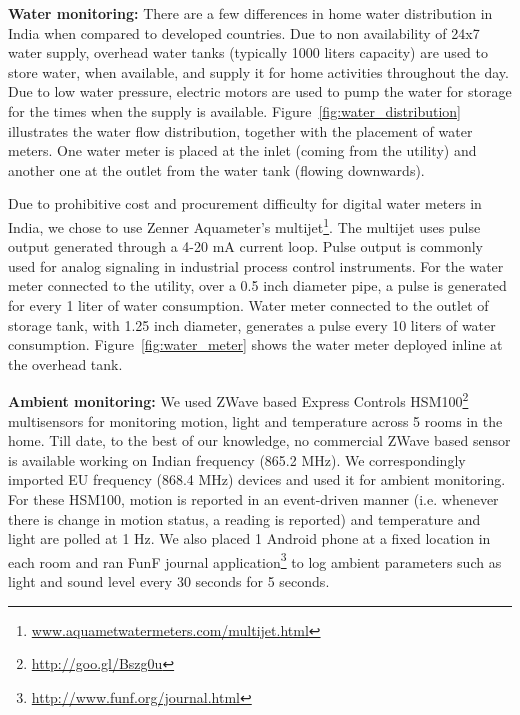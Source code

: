 \documentclass[10pt]{sensys-proc}
\newcommand{\figref}[1]{Figure~\ref{#1}}
\begin{document}
\noindent \textbf{Water monitoring:} There are a few differences in home water distribution in India when compared to developed countries. Due to non availability of 24x7 water supply, overhead water tanks (typically 1000 liters capacity) are used to store water, when available, and supply it for home activities throughout the day. Due to low water pressure, electric motors are used to pump the water for storage for the times when the supply is available. %
\figref{fig:water_distribution} illustrates the water flow distribution, together with the placement of water meters. One water meter is placed at the inlet (coming from the utility) and another one at the outlet from the water tank (flowing downwards). %

Due to prohibitive cost and procurement difficulty for digital water meters in India, we chose to use Zenner Aquameter's multijet\footnote{\url{www.aquametwatermeters.com/multijet.html}}. The multijet uses pulse output generated through a 4-20 mA current loop. Pulse output is commonly used for analog signaling in industrial process control instruments. For the water meter connected to the utility, over a 0.5 inch diameter pipe, a pulse is generated for every 1 liter of water consumption. Water meter connected to the outlet of storage tank, with 1.25 inch diameter, generates a pulse every 10 liters of water consumption. %
\figref{fig:water_meter} shows the water meter deployed inline at the overhead tank.

\noindent \textbf{Ambient monitoring:} We used ZWave based Express Controls HSM100\footnote{\url{http://goo.gl/Bszg0u}} multisensors for monitoring motion, light and temperature across 5 rooms in the home. Till date, to the best of our knowledge, no commercial ZWave based sensor is available working on Indian frequency (865.2 MHz). We correspondingly imported EU frequency (868.4 MHz) devices and used it for ambient monitoring. For these HSM100, motion is reported in an event-driven manner (i.e. whenever there is change in motion status, a reading is reported) and temperature and light are polled at 1 Hz. We also placed 1 Android phone at a fixed location in each room and ran FunF journal application\footnote{\url{http://www.funf.org/journal.html}} to log ambient parameters such as light and sound level every 30 seconds for 5 seconds.
\end{document}
